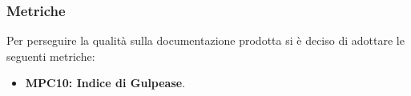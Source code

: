 \subsubsection{Metriche}
Per perseguire la qualità sulla documentazione prodotta si è deciso di adottare le seguenti metriche:
\begin{itemize}
    \item \textbf{MPC10: Indice di Gulpease}.
\end{itemize}